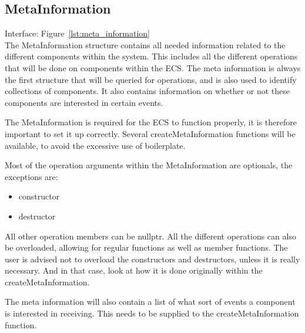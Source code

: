 \subsection{MetaInformation}
Interface: Figure~\ref{lst:meta_information}\\\noindent
The MetaInformation structure contains all needed information related to the different components within the system.
This includes all the different operations that will be done on components within the ECS.
The meta information is always the first structure that will be queried for operations, and is also used to identify collections of components.
It also contains information on whether or not these components are interested in certain events. 

The MetaInformation is required for the ECS to function properly, it is therefore important to set it up correctly.
Several createMetaInformation functions will be available, to avoid the excessive use of boilerplate.

Most of the operation arguments within the MetaInformation are optionals, the exceptions are:
\begin{itemize}
    \item constructor
    \item destructor
\end{itemize}
All other operation members can be nullptr. All the different operations can also be overloaded, 
allowing for regular functions as well as member functions.
The user is advised not to overload the constructors and destructors, unless it is really necessary.
And in that case, look at how it is done originally within the createMetaInformation.

The meta information will also contain a list of what sort of events a component is interested in receiving.
This needs to be supplied to the createMetaInformation function.
